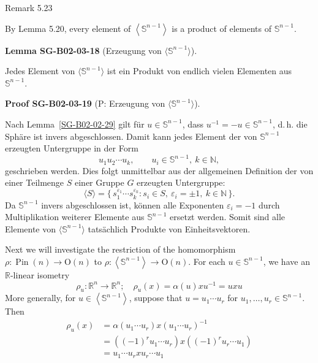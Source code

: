 \documentclass[10pt, letterpaper]{article}
\newcommand{\CustomHeading}[3]{%
  \par\medskip\noindent%
  \textbf{#1 #2} \textnormal{(#3)}.\enskip%
}
\newenvironment{LEM}[2]{\begin{unitbox}\CustomHeading{Lemma}{#1}{#2}}{\end{unitbox}}
\newenvironment{PROOF}[2]{\begin{unitbox}\CustomHeading{Proof}{#1}{#2}}{\end{unitbox}}
\begin{document}
Remark 5.23

By Lemma 5.20, every element of $\left\langle\mathbb{S}^{n-1}\right\rangle$ is a product of elements of $\mathbb{S}^{n-1}$.


\begin{LEM}{SG-B02-03-18}{Erzeugung von \(\langle \mathbb S^{n-1}\rangle\)}
Jedes Element von \(\langle \mathbb S^{n-1}\rangle\) ist ein Produkt von endlich vielen Elementen aus \(\mathbb S^{n-1}\).
\end{LEM}



\begin{PROOF}{SG-B02-03-19}{P: Erzeugung von \(\langle \mathbb S^{n-1}\rangle\)}
Nach Lemma~\ref{SG-B02-02-29} gilt für \(u\in\mathbb S^{n-1}\), dass \(u^{-1}=-u\in \mathbb S^{n-1}\), d.\,h. die Sphäre ist invers abgeschlossen.  
Damit kann jedes Element der von \(\mathbb S^{n-1}\) erzeugten Untergruppe in der Form
\[
u_1 u_2 \cdots u_k, \qquad u_i\in\mathbb S^{n-1}, \ k\in\mathbb N,
\]
geschrieben werden.  
Dies folgt unmittelbar aus der allgemeinen Definition der von einer Teilmenge \(S\) einer Gruppe \(G\) erzeugten Untergruppe:
\[
\langle S\rangle = \{\, s_1^{\varepsilon_1}\cdots s_k^{\varepsilon_k} : s_i\in S,\ \varepsilon_i=\pm1,\ k\in\mathbb N\,\}.
\]
Da \(\mathbb S^{n-1}\) invers abgeschlossen ist, können alle Exponenten \(\varepsilon_i=-1\) durch Multiplikation weiterer Elemente aus \(\mathbb S^{n-1}\) ersetzt werden. Somit sind alle Elemente von \(\langle\mathbb S^{n-1}\rangle\) tatsächlich Produkte von Einheitsvektoren.
\end{PROOF}



Next we will investigate the restriction of the homomorphism $\rho: \operatorname{Pin}(n) \longrightarrow \mathrm{O}(n)$ to $\rho:\left\langle\mathbb{S}^{n-1}\right\rangle \longrightarrow \mathrm{O}(n)$. For each $u \in \mathbb{S}^{n-1}$, we have an $\mathbb{R}$-linear isometry
$$
\rho_{u}: \mathbb{R}^{n} \longrightarrow \mathbb{R}^{n} ; \quad \rho_{u}(x)=\alpha(u) x u^{-1}=u x u
$$
More generally, for $u \in\left\langle\mathbb{S}^{n-1}\right\rangle$, suppose that $u=u_{1} \cdots u_{r}$ for $u_{1}, \ldots, u_{r} \in \mathbb{S}^{n-1}$. Then
$$
\begin{aligned}
\rho_{u}(x) & =\alpha\left(u_{1} \cdots u_{r}\right) x\left(u_{1} \cdots u_{r}\right)^{-1} \\
& =\left((-1)^{r} u_{1} \cdots u_{r}\right) x\left((-1)^{r} u_{r} \cdots u_{1}\right) \\
& =u_{1} \cdots u_{r} x u_{r} \cdots u_{1}
\end{aligned}
$$
\end{document}
